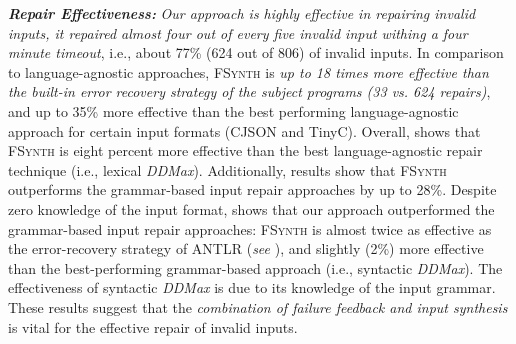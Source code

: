 \documentclass[sigconf,review,anonymous]{acmart}
\newcommand{\recheck}[1]{\textcolor{red}{#1}}
\newcommand{\approach}{\textsc{FSynth}\xspace}
\newcommand{\ddmax}{\textit{DDMax}\xspace}
\begin{document}
\noindent \textbf{\textit{Repair Effectiveness:}} %
\textit{Our approach %
is highly effective in repairing invalid inputs, it repaired almost four out of every five invalid input withing a four minute timeout}, i.e., %
about 77\% (624 out of 806) of invalid inputs. In comparison to language-agnostic approaches, %
\approach is \textit{up to 18 times more effective than the built-in error recovery strategy of the subject programs (33 vs. 624 repairs)}, and %
up to 35\% more effective than the best performing language-agnostic approach for certain input formats (CJSON and TinyC). Overall, 
 shows that \approach is eight percent more effective than the best language-agnostic repair technique (i.e., lexical \ddmax). 
Additionally, results show that %
\approach outperforms the %
grammar-based input repair approaches by up to 28\%. 
Despite zero knowledge of the input format, 
shows that %
our approach outperformed the grammar-based input repair approaches: \approach is almost twice as effective as the error-recovery strategy of ANTLR (\textit{see} ), and 
slightly (2\%) more effective than the best-performing grammar-based approach (i.e., syntactic \ddmax). %
The effectiveness of syntactic \ddmax is due to its knowledge of the input grammar. 
These results suggest that %
the \textit{combination of failure feedback and input synthesis} is vital for the effective repair of invalid inputs. 
\end{document}
